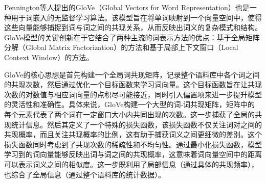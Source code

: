 Pennington等人\cite{GloVe}提出的GloVe（Global Vectors for Word Representation）也是一种用于词嵌入的无监督学习算法。该模型旨在将单词映射到一个向量空间中，使得这些向量能够捕捉到词与词之间的共现关系，从而反映出词义的复杂模式和结构。GloVe模型的关键创新在于它结合了两种主流的词表示方法的优点：基于全局矩阵分解（Global Matrix Factorization）的方法和基于局部上下文窗口（Local Context Window）的方法。

GloVe的核心思想是首先构建一个全局词共现矩阵，记录整个语料库中各个词之间的共现次数，然后通过优化一个目标函数来学习词向量。这个目标函数旨在让共现次数的对数值与相应词向量的点积尽可能接近，同时引入偏置项来进一步提升模型的灵活性和准确性。具体来说，GloVe构建一个大型的词-词共现矩阵，矩阵中的每个元素代表了两个词在一定窗口大小内共同出现的次数。这一步捕获了全局的共现统计信息。然后其定义了一个特殊的损失函数，该损失函数不仅关注词对之间的共现概率，而且关注共现概率的比例，这有助于捕获词义之间更细微的差别。这个损失函数同时考虑到了共现次数的稀疏性和不均匀性。通过最小化损失函数，模型学习到的词向量能够反映出词与词之间的共现概率，这意味着词向量空间中的距离可以表示词义之间的相似度。这一步既利用了局部信息（通过具体的共现频率），也综合了全局信息（通过整个语料库的统计数据）。


